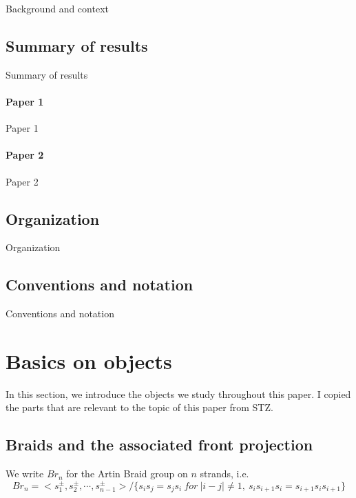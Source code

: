 Background and context

\section{Summary of results}\label{sec_summary_of_results}

Summary of results

\subsubsection*{Paper 1}

Paper 1 \cite{Huber}

\subsubsection*{Paper 2}

Paper 2 \cite{Huber_2}

\section{Organization}

Organization

\section*{Conventions and notation}\label{sec_conventions}

Conventions and notation


\chapter{Basics on objects}
In this section, we introduce the objects we study throughout this paper. I copied the parts that are relevant to the topic of this paper from STZ.
\section{Braids and the associated front projection}                              %
 We write $Br_n$ for the Artin Braid group on $n$ strands, i.e.
\[Br_n=<s_1^{\pm}, s_2^{\pm}, \cdots , s_{n-1}^{\pm}>/\{s_i s_j =s_j s_i ~ for ~ |i-j|\neq 1, ~ s_i s_{i+1}s_i=s_{i+1} s_i s_{i+1}\} \]

